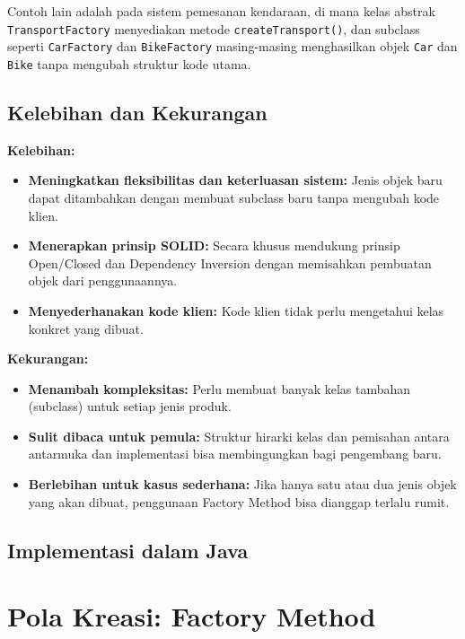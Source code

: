 Contoh lain adalah pada sistem pemesanan kendaraan, di mana kelas abstrak \texttt{TransportFactory} menyediakan metode \texttt{createTransport()}, dan subclass seperti \texttt{CarFactory} dan \texttt{BikeFactory} masing-masing menghasilkan objek \texttt{Car} dan \texttt{Bike} tanpa mengubah struktur kode utama.

\subsection{Kelebihan dan Kekurangan}

\textbf{Kelebihan:}
\begin{itemize}
	\item \textbf{Meningkatkan fleksibilitas dan keterluasan sistem:} Jenis objek baru dapat ditambahkan dengan membuat subclass baru tanpa mengubah kode klien.
	\item \textbf{Menerapkan prinsip SOLID:} Secara khusus mendukung prinsip Open/Closed dan Dependency Inversion dengan memisahkan pembuatan objek dari penggunaannya.
	\item \textbf{Menyederhanakan kode klien:} Kode klien tidak perlu mengetahui kelas konkret yang dibuat.
\end{itemize}

\textbf{Kekurangan:}
\begin{itemize}
	\item \textbf{Menambah kompleksitas:} Perlu membuat banyak kelas tambahan (subclass) untuk setiap jenis produk.
	\item \textbf{Sulit dibaca untuk pemula:} Struktur hirarki kelas dan pemisahan antara antarmuka dan implementasi bisa membingungkan bagi pengembang baru.
	\item \textbf{Berlebihan untuk kasus sederhana:} Jika hanya satu atau dua jenis objek yang akan dibuat, penggunaan Factory Method bisa dianggap terlalu rumit.
\end{itemize}

\subsection{Implementasi dalam Java}

\section{Pola Kreasi: Factory Method}

